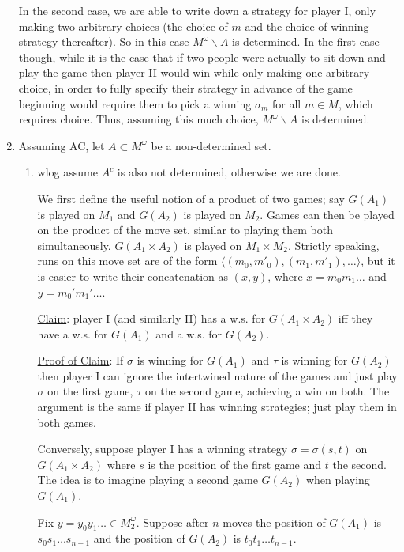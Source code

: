 \documentclass[]{article}
\newcommand{\om}{\omega}
\begin{document}
\begin{enumerate}[label = (\arabic*)]
    In the second case, we are able to write down a strategy for player I, only making two arbitrary choices (the choice of $m$ and the choice of winning strategy thereafter). So in this case $M^\omega \backslash A$ is determined. In the first case though, while it is the case that if two people were actually to sit down and play the game then player II would win while only making one arbitrary choice, in order to fully specify their strategy in advance of the game beginning would require them to pick a winning $\sigma_m$ for all $m\in M$, which requires choice. Thus, assuming this much choice, $M^\omega \backslash A$ is determined.

    \item Assuming AC, let $A\subset M^\om$ be a non-determined set.
    \begin{enumerate}[label = (\alph*)]
        \item wlog assume $A^c$ is also not determined, otherwise we are done.
        
        We first define the useful notion of a product of two games; say $G(A_1)$ is played on $M_1$ and $G(A_2)$ is played on $M_2$. Games can then be played on the product of the move set, similar to playing them both simultaneously. $G(A_1\times A_2)$ is played on $M_1\times M_2$. Strictly speaking, runs on this move set are of the form $\langle (m_0,m'_0),(m_1,m'_1),\dots \rangle$, but it is easier to write their concatenation as $(x,y)$, where $x = m_0m_1\dots$ and $y = m_0'm_1'\dots$.

        \underline{Claim}: player I (and similarly II) has a w.s. for $G(A_1\times A_2)$ iff they have a w.s. for $G(A_1)$ and a w.s. for $G(A_2)$.

        \underline{Proof of Claim}: If $\sigma$ is winning for $G(A_1)$ and $\tau$ is winning for $G(A_2)$ then player I can ignore the intertwined nature of the games and just play $\sigma$ on the first game, $\tau$ on the second game, achieving a win on both. The argument is the same if player II has winning strategies; just play them in both games.

        Conversely, suppose player I has a winning strategy $\sigma = \sigma(s,t)$ on $G(A_1\times A_2)$ where $s$ is the position of the first game and $t$ the second. The idea is to imagine playing a second game $G(A_2)$ when playing $G(A_1)$.

        Fix $y = y_0y_1\dots \in M_2^\om$. Suppose after $n$ moves the position of $G(A_1)$ is $s_0s_1\dots s_{n-1}$ and the position of $G(A_2)$ is $t_0t_1\dots t_{n-1}$. 


\end{enumerate}
\end{enumerate}
\end{document}
